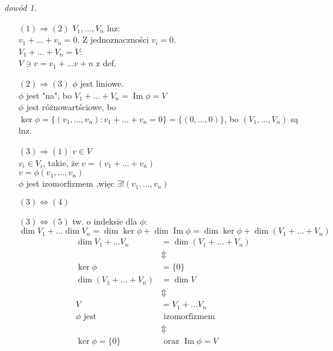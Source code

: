 \documentclass[10pt]{article}
\theoremstyle{definition}
\theoremstyle{definition}
\theoremstyle{definition}
\theoremstyle{definition}
\theoremstyle{remark}
\newtheorem*{dd}{dowód}
\theoremstyle{definition}
\theoremstyle{definition}
\theoremstyle{definition}
\theoremstyle{definition}
\theoremstyle{definition}
\begin{document}
\begin{dd}  \hfill
    \begin{itemize} 
        \item[$(1) \Rightarrow (2)$] $V_1,\ldots,V_n$ lnz: \\ 
            $v_1 + \ldots + v_n = 0$. Z jednoznaczności $v_i = 0$. \\ 
            $V_1 + \ldots + V_n = V$: \\ 
            $V \ni v = v_1 + \ldots v+n$ z def.
        \item [$(2) \Rightarrow (3)$] $\phi$ jest liniowe. \\ 
            $\phi$ jest "na", bo $V_1+\ldots+V_n = \operatorname{Im} \phi = V$ \\ 
            $\phi$ jest różnowartściowe, bo $\ker \phi = \{ (v_1,\ldots,v_n): v_1+\ldots+v_n = 0\} = 
            \{(0,\ldots,0)\}$, bo $(V_1,\ldots,V_n)$ są lnz. 
        \item [$(3) \Rightarrow (1)$] $v \in V$ \\ 
            $v_i \in V_i$, takie, że $v = (v_1 + \ldots + v_n)$ \\ 
            $v = \phi (v_1,\ldots,v_n)$ \\ 
            $\phi$ jest izomorfizmem ,więc $\exists ! (v_1,\ldots,v_n)$ 
        \item [$(3) \Leftrightarrow (4)$] 
        \item [$(3) \Leftrightarrow (5)$] tw. o indeksie dla $\phi$: \\ 
            $\dim V_1 + \ldots \dim V_n = \dim \ker \phi + \dim \operatorname{Im} \phi = 
            \dim \ker \phi + \dim (V_1+\ldots+V_n)$
            \begin{align*} 
                \dim V_1 + \ldots V_n &= \dim (V_1 + \ldots + V_n) \\ 
                &\Updownarrow  \\ 
                \ker \phi &= \{ 0\} \\ 
                \dim (V_1 + \ldots + V_n) &= \dim V \\ 
                &\Updownarrow \\ 
                V &= V_1 + \ldots V_n \\
                \phi \text{ jest} &\text{ izomorfizmem} \\ 
                 &\Updownarrow \\ 
                \ker \phi = \{ 0\} &\text{ oraz } \operatorname{Im} \phi = V
            \end{align*}  
    \end{itemize} 
\end{dd} 
\end{document}
